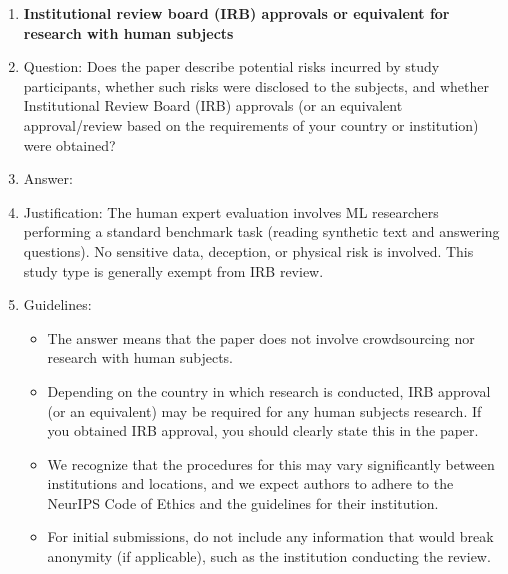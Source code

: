 \begin{enumerate}
\item {\bf Institutional review board (IRB) approvals or equivalent for research with human subjects}
    \item[] Question: Does the paper describe potential risks incurred by study participants, whether such risks were disclosed to the subjects, and whether Institutional Review Board (IRB) approvals (or an equivalent approval/review based on the requirements of your country or institution) were obtained?
    \item[] Answer: \answerNA{}
    \item[] Justification: The human expert evaluation involves ML researchers performing a standard benchmark task (reading synthetic text and answering questions). No sensitive data, deception, or physical risk is involved. This study type is generally exempt from IRB review.
    \item[] Guidelines: \begin{itemize}
        \item The answer \answerNA{} means that the paper does not involve crowdsourcing nor research with human subjects.
        \item Depending on the country in which research is conducted, IRB approval (or an equivalent) may be required for any human subjects research. If you obtained IRB approval, you should clearly state this in the paper.
        \item We recognize that the procedures for this may vary significantly between institutions and locations, and we expect authors to adhere to the NeurIPS Code of Ethics and the guidelines for their institution.
        \item For initial submissions, do not include any information that would break anonymity (if applicable), such as the institution conducting the review.
    \end{itemize}


\end{enumerate}
